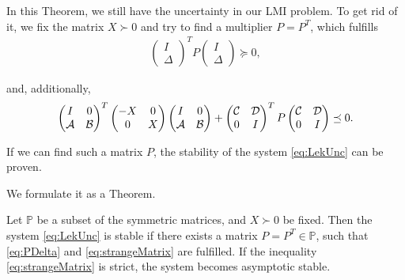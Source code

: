 In this Theorem, we still have the uncertainty in our LMI problem. 
To get rid of it, we fix the matrix $X\succ 0$ and try to find a multiplier $P = P^T$, which fulfills 
\begin{align}
	\label{eq:PDelta}
	\begin{pmatrix}
		I \\ \Delta
	\end{pmatrix}^T 
	P
	\begin{pmatrix}
		I \\ \Delta
	\end{pmatrix} \succeq 0,
\end{align}

and, additionally,
	\begin{align}
	\label{eq:strangeMatrix}
	\begin{pmatrix}
		I & 0 \\ \mathcal{A} &  \mathcal{B}
	\end{pmatrix}^T\begin{pmatrix}
		-X & 0 \\ 0 & X
	\end{pmatrix} 
	\begin{pmatrix}
		I & 0 \\ \mathcal{A} &  \mathcal{B}
	\end{pmatrix} + 
	\begin{pmatrix}
		\mathcal{C} & \mathcal{D} \\ 0 & I
	\end{pmatrix}^T
	P
	\begin{pmatrix}
		\mathcal{C} & \mathcal{D} \\ 0 & I
	\end{pmatrix} \preceq 0.
\end{align}

If we can find such a matrix $P$, the stability of the system \eqref{eq:LekUnc} can be proven. 

We formulate it as a Theorem. 

\begin{theo}
	\label{thm:stabViaP}
	Let $\mathbb{P}$ be a subset of the symmetric matrices, and $X \succ 0 $ be fixed.
	Then the system \eqref{eq:LekUnc} is stable if there exists a matrix $P = P^T \in \mathbb{P}$, such that \eqref{eq:PDelta} and \eqref{eq:strangeMatrix} are fulfilled. 
	If the inequality \eqref{eq:strangeMatrix} is strict, the system becomes asymptotic stable. 
\end{theo}

